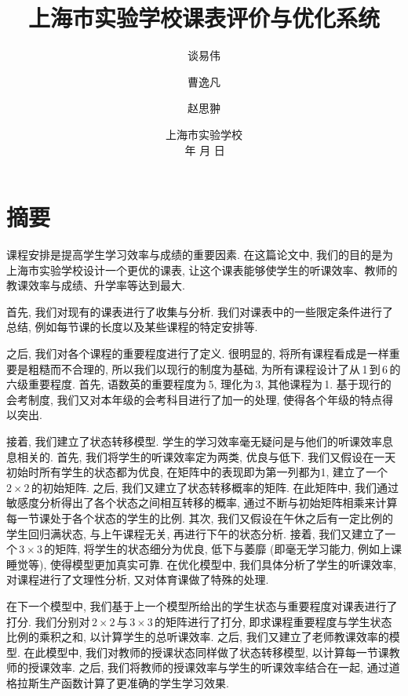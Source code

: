 \documentclass[a4paper]{article}
\begin{document}
\title{\bf 上海市实验学校课表评价与优化系统}
\author{谈易伟\and 曹逸凡\and 赵思翀}
\date{上海市实验学校\\[4mm]\number\year\,年\,\number\month\,月\,\number\day\,日}
\maketitle
\thispagestyle{empty}
\section*{\hfil 摘\quad 要}
 课程安排是提高学生学习效率与成绩的重要因素. 在这篇论文中, 我们的目的是为上海市实验学校设计一个更优的课表, 让这个课表能够使学生的听课效率、教师的教课效率与成绩、升学率等达到最大.\par
 首先, 我们对现有的课表进行了收集与分析. 我们对课表中的一些限定条件进行了总结, 例如每节课的长度以及某些课程的特定安排等.\par
 之后, 我们对各个课程的重要程度进行了定义. 很明显的, 将所有课程看成是一样重要是粗糙而不合理的, 所以我们以现行的制度为基础, 为所有课程设计了从\,1\,到\,6\,的六级重要程度. 首先, 语数英的重要程度为\,5, 理化为\,3, 其他课程为\,1. 基于现行的会考制度, 我们又对本年级的会考科目进行了加一的处理, 使得各个年级的特点得以突出.\par
 接着, 我们建立了状态转移模型. 学生的学习效率毫无疑问是与他们的听课效率息息相关的. 首先, 我们将学生的听课效率定为两类, 优良与低下. 我们又假设在一天初始时所有学生的状态都为优良, 在矩阵中的表现即为第一列都为1, 建立了一个\,$2\times2$\,的初始矩阵. 之后, 我们又建立了状态转移概率的矩阵. 在此矩阵中, 我们通过敏感度分析得出了各个状态之间相互转移的概率, 通过不断与初始矩阵相乘来计算每一节课处于各个状态的学生的比例. 其次, 我们又假设在午休之后有一定比例的学生回归满状态, 与上午课程无关, 再进行下午的状态分析. 接着, 我们又建立了一个\,$3\times3$\,的矩阵, 将学生的状态细分为优良, 低下与萎靡 (即毫无学习能力, 例如上课睡觉等), 使得模型更加真实可靠. 在优化模型中, 我们具体分析了学生的听课效率, 对课程进行了文理性分析, 又对体育课做了特殊的处理.\par
 在下一个模型中, 我们基于上一个模型所给出的学生状态与重要程度对课表进行了打分. 我们分别对\,$2\times2$\,与\,$3\times3$\,的矩阵进行了打分, 即求课程重要程度与学生状态比例的乘积之和, 以计算学生的总听课效率. 之后, 我们又建立了老师教课效率的模型. 在此模型中, 我们对教师的授课状态同样做了状态转移模型, 以计算每一节课教师的授课效率. 之后, 我们将教师的授课效率与学生的听课效率结合在一起, 通过道格拉斯生产函数计算了更准确的学生学习效果.\par
\end{document}
